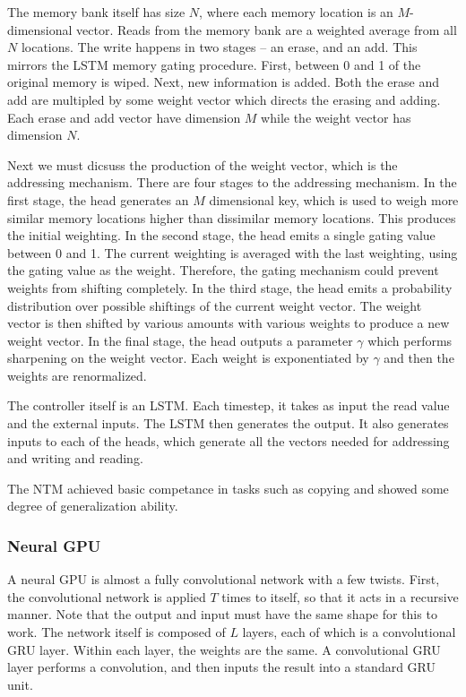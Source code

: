 \documentclass[12pt]{article}
\begin{document}
The memory bank itself has size $N$, where each memory location is an $M$-dimensional vector. Reads from the memory bank are a weighted average from all $N$ locations. The write happens in two stages -- an erase, and an add. This mirrors the LSTM memory gating procedure. First, between 0 and 1 of the original memory is wiped. Next, new information is added. Both the erase and add are multipled by some weight vector which directs the erasing and adding. Each erase and add vector have dimension $M$ while the weight vector has dimension $N$.

Next we must dicsuss the production of the weight vector, which is the addressing mechanism. There are four stages to the addressing mechanism. In the first stage, the head generates an $M$ dimensional key, which is used to weigh more similar memory locations higher than dissimilar memory locations. This produces the initial weighting. In the second stage, the head emits a single gating value between 0 and 1. The current weighting is averaged with the last weighting, using the gating value as the weight. Therefore, the gating mechanism could prevent weights from shifting completely. In the third stage, the head emits a probability distribution over possible shiftings of the current weight vector. The weight vector is then shifted by various amounts with various weights to produce a new weight vector. In the final stage, the head outputs a parameter $\gamma$ which performs sharpening on the weight vector. Each weight is exponentiated by $\gamma$ and then the weights are renormalized.

The controller itself is an LSTM. Each timestep, it takes as input the read value and the external inputs. The LSTM then generates the output. It also generates inputs to each of the heads, which generate all the vectors needed for addressing and writing and reading. 

The NTM achieved basic competance in tasks such as copying and showed some degree of generalization ability. 

\subsubsection{Neural GPU}

A neural GPU is almost a fully convolutional network with a few twists. First, the convolutional network is applied $T$ times to itself, so that it acts in a recursive manner. Note that the output and input must have the same shape for this to work. The network itself is composed of $L$ layers, each of which is a convolutional GRU layer. Within each layer, the weights are the same. A convolutional GRU layer performs a convolution, and then inputs the result into a standard GRU unit. 
\end{document}
